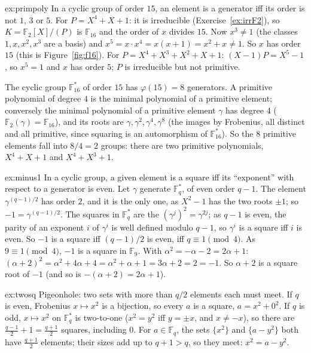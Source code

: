 \begin{solution}{ex:primpoly}
\idea In a cyclic group of order $15$, an element is a generator iff its order is not $1$, $3$ or $5$.
\writeup For $P=X^4+X+1$: it is irreducible (Exercise~\ref{ex:irrF2}), so $K=\mathbb F_2[X]/(P)$ is $\mathbb F_{16}$ and the order of $x$ divides $15$. Now $x^3\ne1$ (the classes $1,x,x^2,x^3$ are a basis) and $x^5=x\cdot x^4=x(x+1)=x^2+x\ne1$. So $x$ has order $15$ (this is Figure~\ref{fig:f16}). For $P=X^4+X^3+X^2+X+1$: $(X-1)P=X^5-1$, so $x^5=1$ and $x$ has order $5$; $P$ is irreducible but not primitive.

The cyclic group $\mathbb F_{16}^*$ of order $15$ has $\varphi(15)=8$ generators. A primitive polynomial of degree $4$ is the minimal polynomial of a primitive element; conversely the minimal polynomial of a primitive element $\gamma$ has degree $4$ ($\mathbb F_2(\gamma)=\mathbb F_{16}$), and its roots are $\gamma,\gamma^2,\gamma^4,\gamma^8$ (the images by Frobenius, all distinct and all primitive, since squaring is an automorphism of $\mathbb F_{16}^*$). So the $8$ primitive elements fall into $8/4=2$ groups: there are two primitive polynomials, $X^4+X+1$ and $X^4+X^3+1$.
\end{solution}

\begin{solution}{ex:minus1}
\idea In a cyclic group, a given element is a square iff its ``exponent'' with respect to a generator is even.
\writeup Let $\gamma$ generate $\mathbb F_q^*$, of even order $q-1$. The element $\gamma^{(q-1)/2}$ has order $2$, and it is the only one, as $X^2-1$ has the two roots $\pm1$; so $-1=\gamma^{(q-1)/2}$. The squares in $\mathbb F_q^*$ are the $(\gamma^j)^2=\gamma^{2j}$; as $q-1$ is even, the parity of an exponent $i$ of $\gamma^i$ is well defined modulo $q-1$, so $\gamma^i$ is a square iff $i$ is even. So $-1$ is a square iff $(q-1)/2$ is even, iff $q\equiv1\pmod4$. As $9\equiv1\pmod4$, $-1$ is a square in $\mathbb F_9$. With $\alpha^2=-\alpha-2=2\alpha+1$: $(\alpha+2)^2=\alpha^2+4\alpha+4=\alpha^2+\alpha+1=3\alpha+2=2=-1$. So $\alpha+2$ is a square root of $-1$ (and so is $-(\alpha+2)=2\alpha+1$).
\end{solution}

\begin{solution}{ex:twosq}
\idea Pigeonhole: two sets with more than $q/2$ elements each must meet.
\writeup If $q$ is even, Frobenius $x\mapsto x^2$ is a bijection, so every $a$ is a square, $a=x^2+0^2$. If $q$ is odd, $x\mapsto x^2$ on $\mathbb F_q^*$ is two-to-one ($x^2=y^2$ iff $y=\pm x$, and $x\ne-x$), so there are $\frac{q-1}2+1=\frac{q+1}2$ squares, including $0$. For $a\in\mathbb F_q$, the sets $\{x^2\}$ and $\{a-y^2\}$ both have $\frac{q+1}2$ elements; their sizes add up to $q+1>q$, so they meet: $x^2=a-y^2$.
\end{solution}

